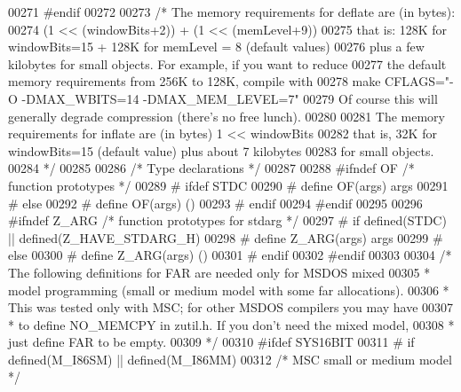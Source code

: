 \begin{DoxyCode}
00271 \textcolor{preprocessor}{#endif}
00272 
00273 \textcolor{comment}{/* The memory requirements for deflate are (in bytes):}
00274 \textcolor{comment}{            (1 << (windowBits+2)) +  (1 << (memLevel+9))}
00275 \textcolor{comment}{ that is: 128K for windowBits=15  +  128K for memLevel = 8  (default values)}
00276 \textcolor{comment}{ plus a few kilobytes for small objects. For example, if you want to reduce}
00277 \textcolor{comment}{ the default memory requirements from 256K to 128K, compile with}
00278 \textcolor{comment}{     make CFLAGS="-O -DMAX\_WBITS=14 -DMAX\_MEM\_LEVEL=7"}
00279 \textcolor{comment}{ Of course this will generally degrade compression (there's no free lunch).}
00280 \textcolor{comment}{}
00281 \textcolor{comment}{   The memory requirements for inflate are (in bytes) 1 << windowBits}
00282 \textcolor{comment}{ that is, 32K for windowBits=15 (default value) plus about 7 kilobytes}
00283 \textcolor{comment}{ for small objects.}
00284 \textcolor{comment}{*/}
00285 
00286                         \textcolor{comment}{/* Type declarations */}
00287 
00288 \textcolor{preprocessor}{#ifndef OF }\textcolor{comment}{/* function prototypes */}\textcolor{preprocessor}{}
00289 \textcolor{preprocessor}{#  ifdef STDC}
00290 \textcolor{preprocessor}{#    define OF(args)  args}
00291 \textcolor{preprocessor}{#  else}
00292 \textcolor{preprocessor}{#    define OF(args)  ()}
00293 \textcolor{preprocessor}{#  endif}
00294 \textcolor{preprocessor}{#endif}
00295 
00296 \textcolor{preprocessor}{#ifndef Z\_ARG }\textcolor{comment}{/* function prototypes for stdarg */}\textcolor{preprocessor}{}
00297 \textcolor{preprocessor}{#  if defined(STDC) || defined(Z\_HAVE\_STDARG\_H)}
00298 \textcolor{preprocessor}{#    define Z\_ARG(args)  args}
00299 \textcolor{preprocessor}{#  else}
00300 \textcolor{preprocessor}{#    define Z\_ARG(args)  ()}
00301 \textcolor{preprocessor}{#  endif}
00302 \textcolor{preprocessor}{#endif}
00303 
00304 \textcolor{comment}{/* The following definitions for FAR are needed only for MSDOS mixed}
00305 \textcolor{comment}{ * model programming (small or medium model with some far allocations).}
00306 \textcolor{comment}{ * This was tested only with MSC; for other MSDOS compilers you may have}
00307 \textcolor{comment}{ * to define NO\_MEMCPY in zutil.h.  If you don't need the mixed model,}
00308 \textcolor{comment}{ * just define FAR to be empty.}
00309 \textcolor{comment}{ */}
00310 \textcolor{preprocessor}{#ifdef SYS16BIT}
00311 \textcolor{preprocessor}{#  if defined(M\_I86SM) || defined(M\_I86MM)}
00312      \textcolor{comment}{/* MSC small or medium model */}

\end{DoxyCode}
